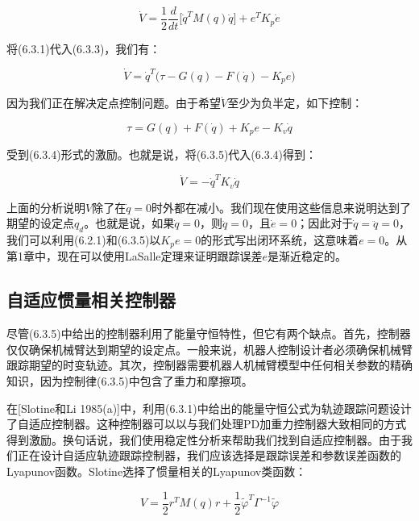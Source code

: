 \documentclass[12pt,a4paper]{ctexart}
\begin{document}
\begin{equation}\label{eq:6.3.3}
\dot{V} = \frac{1}{2}\frac{d}{dt}\bigl[\dot{q}^T M(q)\dot{q}\bigr] + e^T K_p \dot{e}
\end{equation}

将(6.3.1)代入(6.3.3)，我们有：

\begin{equation}\label{eq:6.3.4}
\dot{V} = \dot{q}^T \bigl(\tau - G(q) - F(\dot{q}) - K_p e\bigr)
\end{equation}

因为我们正在解决定点控制问题。由于希望$\dot{V}$至少为负半定，如下控制：

\begin{equation}\label{eq:6.3.5}
\tau = G(q) + F(\dot{q}) + K_p e - K_v \dot{q}
\end{equation}

受到(6.3.4)形式的激励。也就是说，将(6.3.5)代入(6.3.4)得到：

\begin{equation}\label{eq:6.3.6}
\dot{V} = -\dot{q}^T K_v \dot{q}
\end{equation}

上面的分析说明$V$除了在$\dot{q} = 0$时外都在减小。我们现在使用这些信息来说明达到了期望的设定点$q_d$。也就是说，如果$\dot{q} = 0$，则$\ddot{q} = 0$，且$\dot{e} = 0$；因此对于$\dot{q} = \ddot{q} = 0$，我们可以利用(6.2.1)和(6.3.5)以$K_p e = 0$的形式写出闭环系统，这意味着$e = 0$。从第1章中，现在可以使用LaSalle定理来证明跟踪误差$e$是渐近稳定的。

\subsection*{自适应惯量相关控制器}

尽管(6.3.5)中给出的控制器利用了能量守恒特性，但它有两个缺点。首先，控制器仅仅确保机械臂达到期望的设定点。一般来说，机器人控制设计者必须确保机械臂跟踪期望的时变轨迹。其次，控制器需要机器人机械臂模型中任何相关参数的精确知识，因为控制律(6.3.5)中包含了重力和摩擦项。

在[Slotine和Li 1985(a)]中，利用(6.3.1)中给出的能量守恒公式为轨迹跟踪问题设计了自适应控制器。这种控制器可以以与我们处理PD加重力控制器大致相同的方式得到激励。换句话说，我们使用稳定性分析来帮助我们找到自适应控制器。由于我们正在设计自适应轨迹跟踪控制器，我们应该选择是跟踪误差和参数误差函数的Lyapunov函数。Slotine选择了惯量相关的Lyapunov类函数：

\begin{equation}\label{eq:6.3.7}
V = \frac{1}{2}r^T M(q) r + \frac{1}{2}\tilde{\varphi}^T \Gamma^{-1} \tilde{\varphi}
\end{equation}
\end{document}
